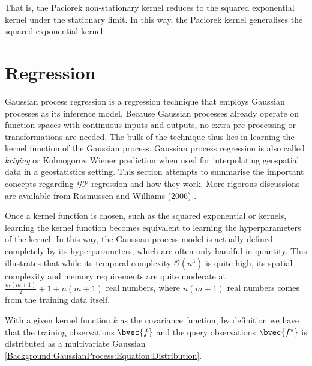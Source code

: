 			That is, the Paciorek non-stationary kernel reduces to the squared exponential kernel under the stationary limit. In this way, the Paciorek kernel generalises the squared exponential kernel.
			
			
			\FloatBarrier
		
	\section{Regression}
	\label{Background:GaussianProcesses:Regression}
	
		Gaussian process regression is a regression technique that employs Gaussian processes as its inference model. Because Gaussian processes already operate on function spaces with continuous inputs and outputs, no extra pre-processing or transformations are needed. The bulk of the technique thus lies in learning the kernel function of the Gaussian process. Gaussian process regression is also called \textit{kriging} or Kolmogorov Wiener prediction when used for interpolating geospatial data in a geostatistics setting. This section attempts to summarise the important concepts regarding $\mathcal{GP}$ regression and how they work. More rigorous discussions are available from Rasmussen and Williams (2006) \cite{GaussianProcessForMachineLearning}. 
		
		Once a kernel function is chosen, such as the squared exponential or \matern kernels, learning the kernel function becomes equivalent to learning the hyperparameters of the kernel. In this way, the Gaussian process model is actually defined completely by its hyperparameters, which are often only handful in quantity. This illustrates that while its temporal complexity $\mathcal{O}(n^{3})$ is quite high, its spatial complexity and memory requirements are quite moderate at $\frac{m(m + 1)}{2} + 1 + n(m  + 1)$ real numbers, where $n(m  + 1)$ real numbers comes from the training data itself. %
		
		With a given kernel function $k$ as the covariance function, by definition we have that the training observations $\bvec{f}$ and the query observations $\bvec{f^{\star}}$ is distributed as a multivariate Gaussian \eqref{Background:GaussianProcess:Equation:Distribution}.
		
